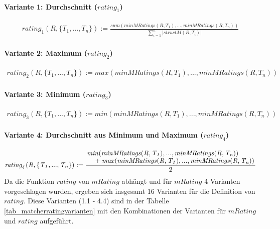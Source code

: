 \paragraph{Variante 1: Durchschnitt ($\mathit{rating}_1$)}

\begin{gather*}
\mathit{rating_1(R,\{T_1,...,T_n\})} := \frac{\mathit{sum(minMRatings(R,T_1),...,minMRatings(R,T_n))}}{\sum_{i=1}^{n}|\mathit{structM(R,T_i)}|}
\end{gather*}

\paragraph{Variante 2: Maximum ($\mathit{rating}_2$)}

\begin{gather*}
\mathit{rating_2(R,\{T_1,...,T_n\})} := \mathit{max(minMRatings(R,T_1),...,minMRatings(R,T_n))}
\end{gather*}

\paragraph{Variante 3: Minimum ($\mathit{rating}_3$)}

\begin{gather*}
\mathit{rating_3(R,\{T_1,...,T_n\})} := \mathit{min(minMRatings(R,T_1),...,minMRatings(R,T_n))}\end{gather*}

\paragraph{Variante 4: Durchschnitt aus Minimum und Maximum ($\mathit{rating}_4$)}

\begin{gather*}
\mathit{rating_4(R,\{T_1,...,T_n\})} := 
	\frac{\splitfrac{\mathit{min(minMRatings(R,T_1),...,
	minMRatings(R,T_n))}}
	{+ \mathit{max(minMRatings(R,T_1),...,minMRatings(R,T_n))}}}{2}	
\end{gather*}
\noindent
Da die Funktion $\mathit{rating}$ von $\mathit{mRating}$ abhängt und für $\mathit{mRating}$ 4 Varianten vorgeschlagen wurden, ergeben sich insgesamt 16 Varianten für die Definition von $\mathit{rating}$. Diese Varianten (1.1 - 4.4) sind in der Tabelle \ref{tab_matcherratingvarianten} mit den Kombinationen der Varianten für $\mathit{mRating}$ und $\mathit{rating}$ aufgeführt.

